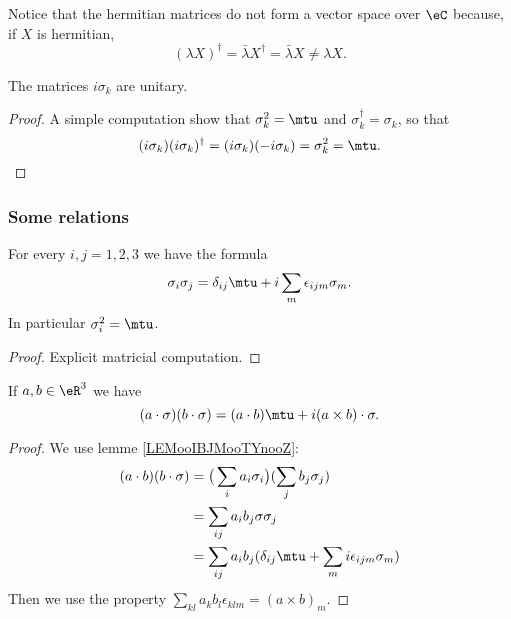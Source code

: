 Notice that the hermitian matrices do not form a vector space over \( \eC\) because, if \( X\) is hermitian,
\begin{equation}
    (\lambda X)^{\dag}=\bar \lambda X^{\dag}=\bar \lambda X\neq \lambda X.
\end{equation}

\begin{lemma}
    The matrices \( i\sigma_k\) are unitary.
\end{lemma}

\begin{proof}
    A simple computation show that \( \sigma_k^2=\mtu\) and \( \sigma_k^{\dag}=\sigma_k\), so that 
    \begin{equation}
        (i\sigma_k)(i\sigma_k)^{\dag}=(i\sigma_k)(-i\sigma_k)=\sigma_k^2=\mtu.
    \end{equation}
\end{proof}

\subsubsection{Some relations}

\begin{lemma}       \label{LEMooIBJMooTYnooZ}
    For every \( i,j=1,2,3\) we have the formula
    \begin{equation}
        \sigma_i\sigma_j=\delta_{ij}\mtu+i\sum_m\epsilon_{ijm}\sigma_m.
    \end{equation}
    In particular \( \sigma_i^2=\mtu\).
\end{lemma}

\begin{proof}
    Explicit matricial computation.
\end{proof}

\begin{lemma}       \label{LEMooLNCSooPHsVut}
    If \( a,b\in \eR^3\) we have
    \begin{equation}
        (a\cdot \sigma)(b\cdot \sigma)=(a\cdot b)\mtu+i(a\times b)\cdot \sigma.
    \end{equation}
\end{lemma}

\begin{proof}
    We use lemme \ref{LEMooIBJMooTYnooZ}:
    \begin{subequations}
        \begin{align}
            (a\cdot b)(b\cdot \sigma)&=\big( \sum_i a_i\sigma_i \big)(\sum_jb_j\sigma_j)\\
            &=\sum_{ij}a_ib_j\sigma\sigma_j\\
            &=\sum_{ij}a_ib_j(\delta_{ij}\mtu+\sum_mi\epsilon_{ijm}\sigma_m)
        \end{align}
    \end{subequations}
    Then we use the property \( \sum_{kl}a_kb_l\epsilon_{klm}=(a\times b)_m\).
\end{proof}

